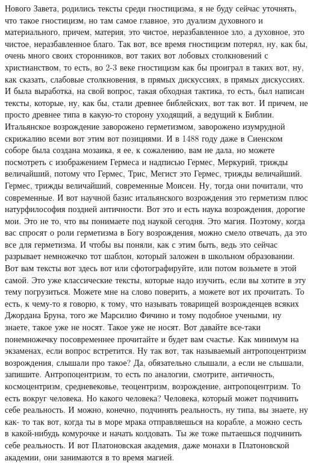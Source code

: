 Нового Завета, родились тексты среди гностицизма, я не буду сейчас уточнять, что
такое гностицизм, но там самое главное, это дуализм духовного и материального,
причем, материя, это чистое, неразбавленное зло, а духовное, это чистое,
неразбавленное благо. Так вот, все время гностицизм потерял, ну, как бы, очень
много своих сторонников, вот таких вот лобовых столкновений с христианством, то
есть, во 2-3 веке гностицизм как бы проиграл в таких вот, ну, как сказать,
слабовые столкновения, в прямых дискуссиях, в прямых дискуссиях. И была
выработка, на свой вопрос, такая обходная тактика, то есть, был написан тексты,
которые, ну, как бы, стали древнее библейских, вот так вот. И причем, не просто
древнее типа в какую-то сторону уходящий, а ведущий к Библии. Итальянское
возрождение заворожено герметизмом, заворожено изумрудной скрижалию всеми вот
этим вот позициями. И в 1488 году даже в Сиенском соборе была создана мозаика, я
ее, к сожалению, вам не дала, но можете посмотреть с изображением Гермеса и
надписью Гермес, Меркурий, трижды величайший, потому что Гермес, Трис, Мегист
это Гермес, трижды величайший. Гермес, трижды величайший, современные Моисеи.
Ну, тогда они почитали, что современные. И вот научной базис итальянского
возрождения это герметизм плюс натурфилософия поздней античности. Вот это и есть
наука возрождения, дорогие мои. Это не то, что вы понимаете под наукой сегодня.
Это магия. Поэтому, когда вас спросят о роли герметизма в Богу возрождения,
можно смело отвечать, да это все для герметизма. И чтобы вы поняли, как с этим
быть, ведь это сейчас разрывает немножечко тот шаблон, который заложен в
школьном образовании. Вот вам тексты вот здесь вот или сфотографируйте, или
потом возьмете в этой самой. Это уже классические тексты, которые надо изучить,
если вы хотите в эту тему погрузиться. Можете мне на слово поверить, а можете
вот их прочитать. То есть, к чему-то я говорю, к тому, что называть товарищей
возрожденцев всяких Джордана Бруна, того же Марсилио Фичино и тому подобное
учеными, ну знаете, такое уже не носят. Такое уже не носят. Вот давайте все-таки
понемножечку посовременнее прочитайте и будет вам счастье. Как минимум на
экзаменах, если вопрос встретится. Ну так вот, так называемый антропоцентризм
возрождения, слышали про такое? Да, обязательно слышали, а если не слышали,
запишите. Антропоцентризм, то есть по аналогии, смотрите, античность,
космоцентризм, средневековье, теоцентризм, возрождение, антропоцентризм. То есть
вокруг человека. Но какого человека? Человека, который может подчинить себе
реальность. И можно, конечно, подчинять реальность, ну типа, вы знаете, ну как-
то так вот, когда ты в море мрака отправляешься на корабле, а можно сесть в
какой-нибудь комурочке и начать колдовать. Ты же тоже пытаешься подчинить себе
реальность. И вот Платоновская академия, даже монахи в Платоновской академии,
они занимаются в то время магией. 

